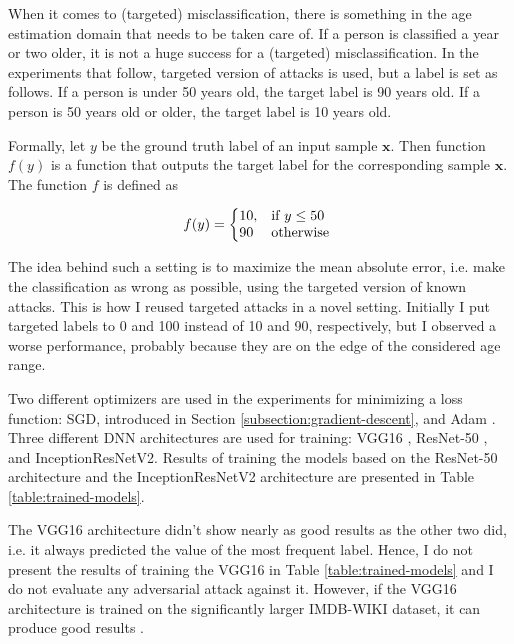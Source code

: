 When it comes to (targeted) misclassification, there is something in the age estimation domain that needs to be taken care of. If a person is classified a year or two older, it is not a huge success for a (targeted) misclassification. In the experiments that follow, targeted version of attacks is used, but a label is set as follows. If a person is under 50 years old, the target label is 90 years old. If a person is 50 years old or older, the target label is 10 years old. 

Formally, let $y$ be the ground truth label of an input sample $\pmb x$. Then function $f(y)$ is a function that outputs the target label for the corresponding sample $\pmb x$. The function $f$ is defined as

\begin{equation}
  f(y)=\left\{
  \begin{array}{@{}ll@{}}
       10, & \text{if } y \leq 50 \\
   	  90 & \text{otherwise }
  \end{array}\right.
\end{equation} 

The idea behind such a setting is to maximize the mean absolute error, i.e. make the classification as wrong as possible, using the targeted version of known attacks.  This is how I reused targeted attacks in a novel setting. Initially I put targeted labels to 0 and 100 instead of 10 and 90, respectively, but I observed a worse performance, probably because they are on the edge of the considered age range.

Two different optimizers are used in the experiments for minimizing a loss function: SGD, introduced in Section \ref{subsection:gradient-descent}, and Adam \cite{DBLP:journals/corr/KingmaB14}. Three different DNN architectures are used for training: VGG16 \cite{DBLP:journals/corr/SimonyanZ14a}, ResNet-50 \cite{DBLP:journals/corr/HeZRS15}, and InceptionResNetV2\cite{DBLP:journals/corr/SzegedyIV16}. Results of training the models based on the ResNet-50 architecture and the InceptionResNetV2 architecture are presented in Table \ref{table:trained-models}. 

The VGG16 architecture didn't show nearly as good results as the other two did, i.e. it always predicted the value of the most frequent label. Hence, I do not present the results of training the VGG16 in Table \ref{table:trained-models} and I do not evaluate any adversarial attack against it. However, if the VGG16 architecture is trained on the significantly larger IMDB-WIKI dataset, it can produce good results \cite{Rothe-IJCV-2016}. 

